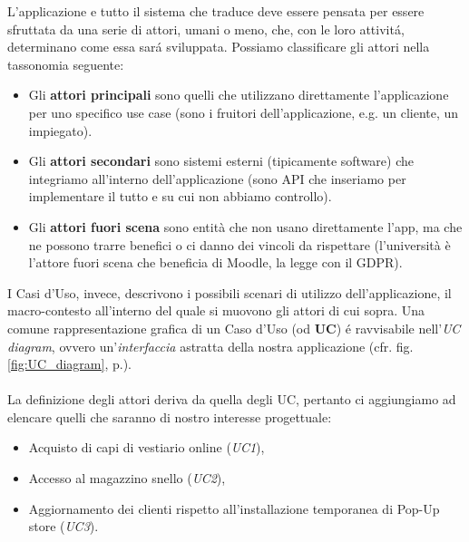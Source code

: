 \documentclass[12pt]{article}
\begin{document}
L'applicazione e tutto il sistema che traduce deve essere pensata per essere sfruttata da una serie di attori, umani o meno, che, con le loro attivit\'a, determinano come essa sar\'a sviluppata. Possiamo classificare gli attori nella tassonomia seguente:
\begin{itemize}
    \item Gli \textbf{attori principali} sono quelli che utilizzano direttamente l’applicazione per uno specifico use case (sono i fruitori dell’applicazione, e.g. un cliente, un impiegato).
    \item Gli \textbf{attori secondari} sono sistemi esterni (tipicamente software) che integriamo all’interno dell’applicazione (sono API che inseriamo per implementare il tutto e su cui non abbiamo controllo).
    \item Gli \textbf{attori fuori scena} sono entità che non usano direttamente l’app, ma che ne possono trarre benefici o ci danno dei vincoli da rispettare (l’università è l’attore fuori scena che beneficia di Moodle, la legge con il GDPR).
\end{itemize}

I Casi d'Uso, invece, descrivono i possibili scenari di utilizzo dell'applicazione, il macro-contesto all'interno del quale si muovono gli attori di cui sopra. Una comune rappresentazione grafica di un Caso d'Uso (od \textbf{UC}) \'e ravvisabile nell'{\em UC diagram}, ovvero un'\textit{interfaccia} astratta della nostra applicazione (cfr. fig. \ref{fig:UC_diagram}, p.\pageref{fig:UC_diagram}).
\\
\\
La definizione degli attori deriva da quella degli UC, pertanto ci aggiungiamo ad elencare quelli che saranno di nostro interesse progettuale:
\begin{itemize}
    \item Acquisto di capi di vestiario online (\textit{UC1}),
    \item Accesso al magazzino snello (\textit{UC2}),
    \item Aggiornamento dei clienti rispetto all'installazione temporanea di Pop-Up store (\textit{UC3}).
\end{itemize}
\end{document}

